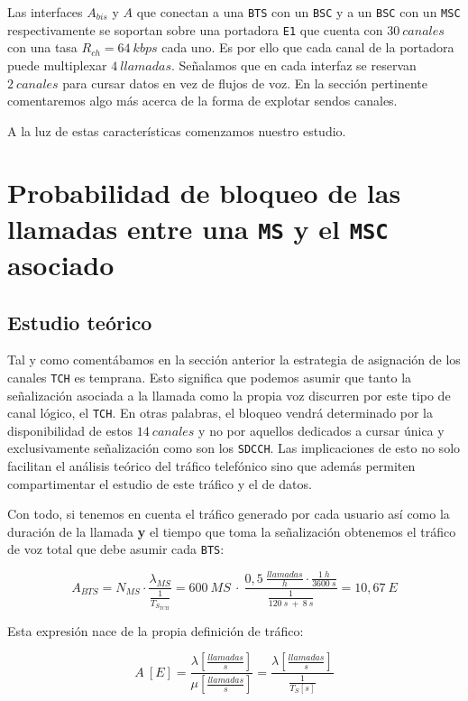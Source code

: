 \documentclass[10pt]{article}
\begin{document}
			Las interfaces $A_{bis}$ y $A$ que conectan a una \texttt{BTS} con un \texttt{BSC} y a un \texttt{BSC} con un \texttt{MSC} respectivamente se soportan sobre una portadora \texttt{E1} que cuenta con $30\ canales$ con una tasa $R_{ch} = 64\ kbps$ cada uno. Es por ello que cada canal de la portadora puede multiplexar $4\ llamadas$. Señalamos que en cada interfaz se reservan $2\ canales$ para cursar datos en vez de flujos de voz. En la sección pertinente comentaremos algo más acerca de la forma de explotar sendos canales.

			A la luz de estas características comenzamos nuestro estudio.

	\section{Probabilidad de bloqueo de las llamadas entre una \texttt{MS} y el \texttt{MSC} asociado}
		\subsection{Estudio teórico}
			Tal y como comentábamos en la sección anterior la estrategia de asignación de los canales \texttt{TCH} es temprana. Esto significa que podemos asumir que tanto la señalización asociada a la llamada como la propia voz discurren por este tipo de canal lógico, el \texttt{TCH}. En otras palabras, el bloqueo vendrá determinado por la disponibilidad de estos $14\ canales$ y no por aquellos dedicados a cursar única y exclusivamente señalización como son los \texttt{SDCCH}. Las implicaciones de esto no solo facilitan el análisis teórico del tráfico telefónico sino que además permiten compartimentar el estudio de este tráfico y el de datos.

			Con todo, si tenemos en cuenta el tráfico generado por cada usuario así como la duración de la llamada \textbf{y} el tiempo que toma la señalización obtenemos el tráfico de voz total que debe asumir cada \texttt{BTS}:

			$$A_{BTS} = N_{MS} \cdot \frac{\lambda_{MS}}{\frac{1}{T_{S_{TCH}}}} = 600\ MS\ \cdot\ \frac{0,5\ \frac{llamadas}{h} \cdot \frac{1\ h}{3600\ s}}{\frac{1}{120\ s\ +\ 8\ s}} = 10,67\ E$$

			Esta expresión nace de la propia definición de tráfico:
			
			$$A\ [E] = \frac{\lambda [\frac{llamadas}{s}]}{\mu [\frac{llamadas}{s}]} = \frac{\lambda [\frac{llamadas}{s}]}{\frac{1}{T_S [s]}}$$
\end{document}
